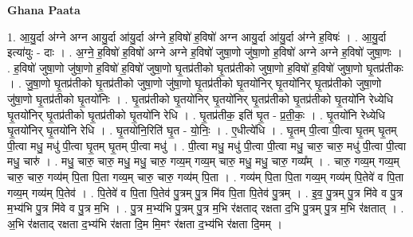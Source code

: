 \documentclass[17pt]{extarticle}
\begin{document}
\textbf{Ghana Paata } \newline

1. आ॒यु॒र्दा अ॑ग्ने अग्न आयु॒र्दा आ॑यु॒र्दा अ॑ग्ने ह॒विषो॑ ह॒विषो॑ अग्न आयु॒र्दा आ॑यु॒र्दा अ॑ग्ने ह॒विषः॑ । . आ॒यु॒र्दा इत्या॑युः - दाः । . अ॒ग्ने॒ ह॒विषो॑ ह॒विषो॑ अग्ने अग्ने ह॒विषो॑ जुषा॒णो जु॑षा॒णो ह॒विषो॑ अग्ने अग्ने ह॒विषो॑ जुषा॒णः । . ह॒विषो॑ जुषा॒णो जु॑षा॒णो ह॒विषो॑ ह॒विषो॑ जुषा॒णो घृ॒तप्र॑तीको घृ॒तप्र॑तीको जुषा॒णो ह॒विषो॑ ह॒विषो॑ जुषा॒णो घृ॒तप्र॑तीकः । . जु॒षा॒णो घृ॒तप्र॑तीको घृ॒तप्र॑तीको जुषा॒णो जु॑षा॒णो घृ॒तप्र॑तीको घृ॒तयो॑निर् घृ॒तयो॑निर् घृ॒तप्र॑तीको जुषा॒णो जु॑षा॒णो घृ॒तप्र॑तीको घृ॒तयो॑निः । . घृ॒तप्र॑तीको घृ॒तयो॑निर् घृ॒तयो॑निर् घृ॒तप्र॑तीको घृ॒तप्र॑तीको घृ॒तयो॑नि रेध्येधि घृ॒तयो॑निर् घृ॒तप्र॑तीको घृ॒तप्र॑तीको घृ॒तयो॑नि रेधि । . घृ॒तप्र॑तीक॒ इति॑ घृ॒त - प्र॒ती॒कः॒ । . घृ॒तयो॑नि रेध्येधि घृ॒तयो॑निर् घृ॒तयो॑नि रेधि । . घृ॒तयो॑नि॒रिति॑ घृ॒त - यो॒निः॒ । . ए॒धीत्ये॑धि । . घृ॒तम् पी॒त्वा पी॒त्वा घृ॒तम् घृ॒तम् पी॒त्वा मधु॒ मधु॑ पी॒त्वा घृ॒तम् घृ॒तम् पी॒त्वा मधु॑ । . पी॒त्वा मधु॒ मधु॑ पी॒त्वा पी॒त्वा मधु॒ चारु॒ चारु॒ मधु॑ पी॒त्वा पी॒त्वा मधु॒ चारु॑ । . मधु॒ चारु॒ चारु॒ मधु॒ मधु॒ चारु॒ गव्य॒म् गव्य॒म् चारु॒ मधु॒ मधु॒ चारु॒ गव्य᳚म् । . चारु॒ गव्य॒म् गव्य॒म् चारु॒ चारु॒ गव्य॑म् पि॒ता पि॒ता गव्य॒म् चारु॒ चारु॒ गव्य॑म् पि॒ता । . गव्य॑म् पि॒ता पि॒ता गव्य॒म् गव्य॑म् पि॒तेवे॑ व पि॒ता गव्य॒म् गव्य॑म् पि॒तेव॑ । . पि॒तेवे॑ व पि॒ता पि॒तेव॑ पु॒त्रम् पु॒त्र मि॑व पि॒ता पि॒तेव॑ पु॒त्रम् । . इ॒व॒ पु॒त्रम् पु॒त्र मि॑वे व पु॒त्र म॒भ्य॑भि पु॒त्र मि॑वे व पु॒त्र म॒भि । . पु॒त्र म॒भ्य॑भि पु॒त्रम् पु॒त्र म॒भि र॑क्षताद् रक्षता द॒भि पु॒त्रम् पु॒त्र म॒भि र॑क्षतात् । . अ॒भि र॑क्षताद् रक्षता द॒भ्य॑भि र॑क्षता दि॒म मि॒मꣳ र॑क्षता द॒भ्य॑भि र॑क्षता दि॒मम् । \newline
\end{document}

